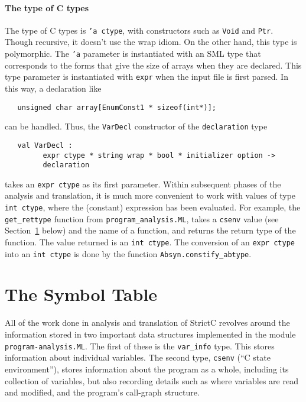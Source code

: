 \documentclass{article}
\newcommand{\strictc}{\textsf{StrictC}}
\newcommand{\MLsuffix}{.ML}
\newcommand{\srcfile}[1]{\texttt{#1}}
\newcommand{\MLfile}[1]{\srcfile{#1\MLsuffix}}
\begin{document}
\paragraph{The type of C types}
The type of C types is \texttt{'a ctype}, with constructors such as
\texttt{Void} and \texttt{Ptr}.  Though recursive, it doesn't use the
wrap idiom.  On the other hand, this type is polymorphic.  The
\texttt{'a} parameter is instantiated with an SML type that
corresponds to the forms that give the size of arrays when they are
declared.  This type parameter is instantiated with \texttt{expr} when
the input file is first parsed.  In this way, a declaration like
\begin{verbatim}
   unsigned char array[EnumConst1 * sizeof(int*)];
\end{verbatim}
can be handled.  Thus, the \texttt{VarDecl} constructor of the
\texttt{declaration} type
\begin{verbatim}
   val VarDecl :
         expr ctype * string wrap * bool * initializer option ->
         declaration
\end{verbatim}
takes an \texttt{expr~ctype} as its first parameter.  Within
subsequent phases of the analysis and translation, it is much more
convenient to work with values of type \texttt{int~ctype}, where the
(constant) expression has been evaluated.  For example, the
\texttt{get_rettype} function from \MLfile{program_analysis},
takes a \texttt{csenv} value (see Section~\ref{sec:symbol-table}
below) and the name of a function, and returns the return type of the
function.  The value returned is an \texttt{int~ctype}.  The
conversion of an \texttt{expr~ctype} into an \texttt{int~ctype} is done
by the function \texttt{Absyn.constify_abtype}.

\section{The Symbol Table}
\label{sec:symbol-table}

All of the work done in analysis and translation of \strictc{} revolves
around the information stored in two important data structures
implemented in the module \MLfile{program-analysis}.  The first of
these is the \texttt{var_info} type.  This stores information about
individual variables.  The second type, \texttt{csenv} (``C state
environment''), stores information about the program as a whole,
including its collection of variables, but also recording details such
as where variables are read and modified, and the program's call-graph
structure.
\end{document}
